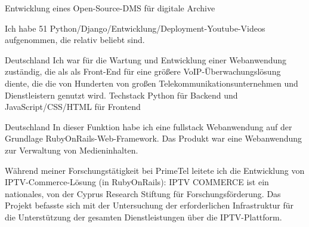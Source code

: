\documentclass[11pt,a4paper,sans]{moderncv}
\begin{document}
    \vspace{0.4cm}

    {Entwicklung eines Open-Source-DMS für digitale Archive}


  \vspace{0.4cm}

     { Ich habe 51 Python/Django/Entwicklung/Deployment-Youtube-Videos
     aufgenommen, die relativ beliebt sind. }



    \vspace{0.4cm}

     { Deutschland }{ Ich war für die Wartung und Entwicklung einer
     Webanwendung zuständig, die als als Front-End für eine größere
     VoIP-Überwachungslösung diente, die die von Hunderten von großen
     Telekommunikationsunternehmen und Dienstleistern genutzt wird. Techstack
      Python für Backend und JavaScript/CSS/HTML für Frontend }

  \vspace{0.4cm}

     { Deutschland }{ In dieser Funktion habe ich eine fullstack Webanwendung
     auf der Grundlage RubyOnRails-Web-Framework. Das Produkt war eine
     Webanwendung zur Verwaltung von Medieninhalten. }

  \vspace{0.4cm}

     { Während meiner Forschungstätigkeit bei PrimeTel leitete ich die
     Entwicklung von IPTV-Commerce-Lösung (in RubyOnRails): IPTV COMMERCE ist
     ein nationales, von der Cyprus Research Stiftung für Forschungsförderung.
     Das Projekt befasste sich mit der Untersuchung der erforderlichen
     Infrastruktur für die Unterstützung der gesamten Dienstleistungen über die
     IPTV-Plattform. }
\end{document}
